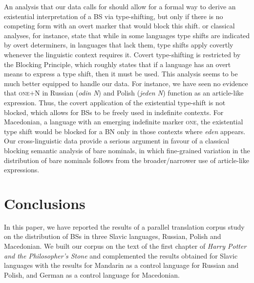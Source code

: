 \documentclass[output=paper,colorlinks,citecolor=brown]{langscibook}
\begin{document}
An analysis that our data calls for should allow for a formal way to derive an existential interpretation of a BS via type-shifting, but only if there is no competing form with an overt marker that would block this shift.  or  classical analyses, for instance, state that while in some languages type shifts are indicated by overt determiners, in languages that lack them, type shifts apply covertly whenever the linguistic context requires it. Covert type-shifting is restricted by the Blocking Principle, which roughly states that if a language has an overt means to express a type shift, then it must be used. 
This analysis seems to be much better equipped to handle our data. For instance, we have seen no evidence  that \textsc{one}$+$N  in Russian (\textit{odin N}) and Polish (\textit{jeden N}) function as an article-like expression. 
Thus, the covert application of the existential type-shift is not blocked, which allows for BSs to be freely used in indefinite contexts. For Macedonian, a language with an emerging indefinite marker \textsc{one}, the existential type shift would be blocked for a BN only in those contexts where \textit{eden} appears. Our cross-linguistic data provide a serious argument in favour of a classical blocking semantic analysis of bare nominals, in which fine-grained variation in the distribution of bare nominals follows from the broader/narrower use of article-like expressions.




\section{Conclusions} \label{conclusions}

In this paper, we have reported the results of a parallel translation corpus study on the distribution of BSs in three Slavic languages, Russian, Polish and Macedonian. We built our corpus on the text of the first chapter of 
\textit{Harry Potter and the Philosopher's Stone} and complemented the results obtained for Slavic languages with the results for Mandarin as a control language for Russian and Polish, and German as a control language for Macedonian. 
\end{document}

